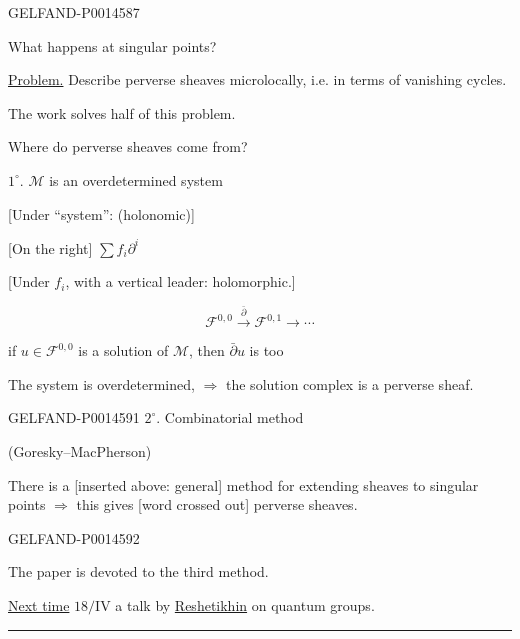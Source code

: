 \begin{GelfandAdjacentEvidence}{GELFAND-P001458}{7}


What happens at singular points?

\uline{Problem.} Describe perverse sheaves microlocally, i.e. in terms of vanishing cycles.

The work solves half of this problem.

 Where do perverse sheaves come from?

\(1^\circ\). \(\mathcal M\) is an overdetermined system

[Under “system”: (holonomic)]

[On the right] \(\sum f_i\partial^i\)

[Under \(f_i\), with a vertical leader: holomorphic.]

\[
\mathcal F^{0,0}\overset{\bar\partial}{\longrightarrow}\mathcal F^{0,1}\longrightarrow\cdots
\]

\end{GelfandAdjacentEvidence}

if \(u\in\mathcal F^{0,0}\) is a solution of \(\mathcal M\), then \(\bar\partial u\) is too

The system is overdetermined, \(\Rightarrow\) the solution complex is a perverse sheaf.


\begin{GelfandAdjacentEvidence}{GELFAND-P001459}{1}
\(2^\circ\). Combinatorial method

(Goresky–MacPherson)

There is a [inserted above: general] method for extending sheaves to singular points \(\Rightarrow\) this gives [word crossed out] perverse sheaves.
\end{GelfandAdjacentEvidence}
\begin{GelfandAdjacentEvidence}{GELFAND-P001459}{2}


The paper is devoted to the third method.

\underline{Next time} \(18/\mathrm{IV}\) a talk by \underline{Reshetikhin} on quantum groups.

\noindent\rule{.48\linewidth}{.35pt}
\end{GelfandAdjacentEvidence}




